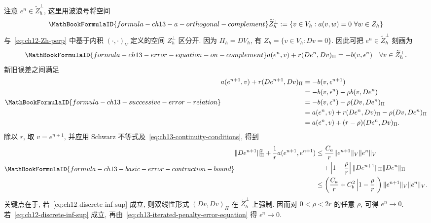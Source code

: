 注意 $e^n\in\widetilde Z_h^\perp$, 这里用波浪号将空间
\begin{equation}
\MathBookFormulaID{formula-ch13-a-orthogonal-complement}
\label{eq:ch13-a-orthogonal-complement}
\widetilde Z_h^\perp
:=\{v\in V_h:a(v,w)=0\ \forall w\in Z_h\}
\end{equation}
与~\eqref{eq:ch12-Zh-perp} 中基于内积 $(\cdot,\cdot)_V$ 定义的空间 $Z_h^\perp$ 区分开. 因为 $\Pi_h=DV_h$, 有 $Z_h=\{v\in V_h:Dv=0\}$. 因此可把 $e^n\in\widetilde Z_h^\perp$ 刻画为
\begin{equation}
\MathBookFormulaID{formula-ch13-error-equation-on-complement}
\label{eq:ch13-error-equation-on-complement}
a(e^n,v)+r(De^n,Dv)_\Pi=-b(v,\epsilon^n)
\quad\forall v\in\widetilde Z_h^\perp.
\end{equation}
新旧误差之间满足
\begin{equation}
\MathBookFormulaID{formula-ch13-successive-error-relation}
\label{eq:ch13-successive-error-relation}
\begin{aligned}
a(e^{n+1},v)+r(De^{n+1},Dv)_\Pi
&=-b(v,\epsilon^{n+1})\\
&=-b(v,\epsilon^n)-\rho b(v,De^n)\\
&=-b(v,\epsilon^n)-\rho(Dv,De^n)_\Pi\\
&=a(e^n,v)+r(De^n,Dv)_\Pi-\rho(Dv,De^n)_\Pi\\
&=a(e^n,v)+(r-\rho)(De^n,Dv)_\Pi.
\end{aligned}
\end{equation}
除以 $r$, 取 $v=e^{n+1}$, 并应用 Schwarz 不等式及~\eqref{eq:ch13-continuity-conditions}, 得到
\begin{equation}
\MathBookFormulaID{formula-ch13-basic-error-contraction-bound}
\label{eq:ch13-basic-error-contraction-bound}
\begin{aligned}
\|De^{n+1}\|_\Pi^2+\frac1r a(e^{n+1},e^{n+1})
&\leq\frac{C_a}{r}\|e^{n+1}\|_V\|e^n\|_V\\
&\quad+\left|1-\frac\rho r\right|
\|De^{n+1}\|_\Pi\|De^n\|_\Pi\\
&\leq\left(\frac{C_a}{r}+C_b^2\left|1-\frac\rho r\right|\right)
\|e^{n+1}\|_V\|e^n\|_V.
\end{aligned}
\end{equation}
关键点在于, 若~\eqref{eq:ch12-discrete-inf-sup} 成立, 则双线性形式 $(Dv,Dv)_\Pi$ 在 $\widetilde Z_h^\perp$ 上强制. 因而对 $0<\rho<2r$ 的任意 $\rho$, 可得 $e^n\to0$. 若~\eqref{eq:ch12-discrete-inf-sup} 成立, 再由~\eqref{eq:ch13-iterated-penalty-error-equation} 得 $\epsilon^n\to0$.

